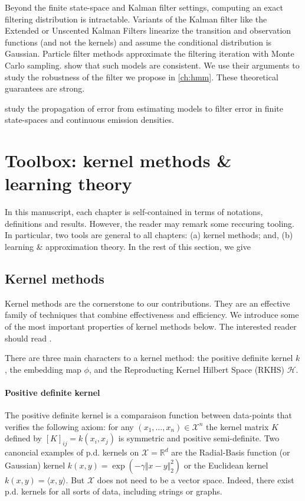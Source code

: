 Beyond the finite state-space and Kalman filter settings, computing an exact filtering distribution is intractable. Variants of the Kalman filter like the Extended or Unscented Kalman Filters linearize the transition and observation functions (and not the kernels) and assume the conditional distribution is Gaussian\cite{sarkka}. Particle filter methods approximate the filtering iteration with Monte Carlo sampling\cite{pf,smc}. \cite{oudjane,legland,} show that such models are consistent. We use their arguments to study the robustness of the filter we propose in \cref{ch:hmm}. These theoretical guarantees are strong.

\cite{castro,mitrophanov} study the propagation of error from estimating models to filter error in finite state-spaces and continuous emission densities.

\section{Toolbox: kernel methods \& learning theory}\label{sec:tools}
In this manuscript, each chapter is self-contained in terms of notations, definitions and results. However, the reader may remark some reccuring tooling. In particular, two tools are general to all chapters: (a) kernel methods; and, (b) learning \& approximation theory. In the rest of this section, we give


\subsection{Kernel methods}
Kernel methods are the cornerstone to our contributions. They are an effective family of techniques that combine effectiveness and efficiency. We introduce some of the most important properties of kernel methods below. The interested reader should read \cite{kernels-intro,kernels-mva}.

There are three main characters to a kernel method: the positive definite kernel $k$, the embedding map $\phi$, and the Reproducting Kernel Hilbert Space (RKHS) $\mathcal H$.

\paragraph{Positive definite kernel}
The positive definite kernel is a comparaison function between data-points that verifies the following axiom: for any $(x_1, \ldots, x_n)\in\mathcal X^n$ the kernel matrix $K$ defined by $[K]_{ij} = k(x_i, x_j)$ is symmetric and positive semi-definite. Two canoncial examples of p.d. kernels on $\mathcal X = \mathbb R^d$ are the Radial-Basis function (or Gaussian) kernel $k(x, y) = \exp(-\gamma \Vert x - y \Vert_2^2)$ or the Euclidean kernel $k(x, y) = \langle x, y \rangle$. But $\mathcal X$ does not need to be a vector space. Indeed, there exist p.d. kernels for all sorts of data, including strings or graphs.

